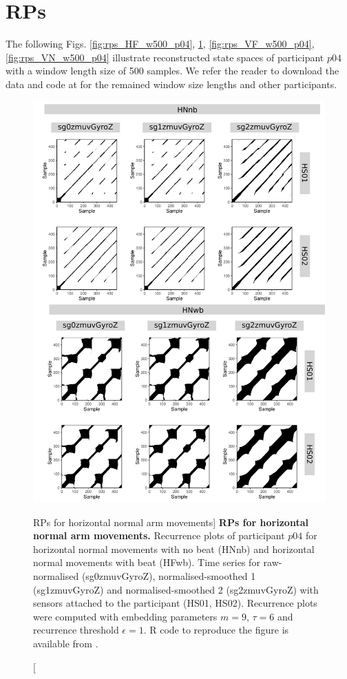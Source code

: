 \newpage
\section{RPs} \label{appendix:d:rps}


The following Figs.  
\ref{fig:rps_HF_w500_p04},
\ref{fig:rps_HN_w500_p04},
\ref{fig:rps_VF_w500_p04},
\ref{fig:rps_VN_w500_p04}
illustrate reconstructed state spaces 
of participant $p04$ with a window length size of 500 samples.
We refer the reader to download the data and code at \cite{xochicale2018}
for the remained window size lengths and other participants.






\begin{figure}
\centering
\includegraphics[height=0.8\textheight]{rps_HN_w500_p04}
\caption
	[RPs for horizontal normal arm movements]{
	{\bf RPs for horizontal normal arm movements.}	
	Recurrence plots of participant $p04$ for 
	horizontal normal movements with no beat (HNnb) and
	horizontal normal movements with beat (HFwb).
	Time series for raw-normalised (sg0zmuvGyroZ), 
	normalised-smoothed 1 (sg1zmuvGyroZ) and 
	normalised-smoothed 2 (sg2zmuvGyroZ) with
	sensors attached to the participant (HS01, HS02).
	Recurrence plots were computed with 
	embedding parameters $m=9$, $\tau=6$ and 
	recurrence threshold $\epsilon=1$.
	R code to reproduce the figure is available from \cite{xochicale2018}.
        }
    \label{fig:rps_HN_w500_p04}
\end{figure}
